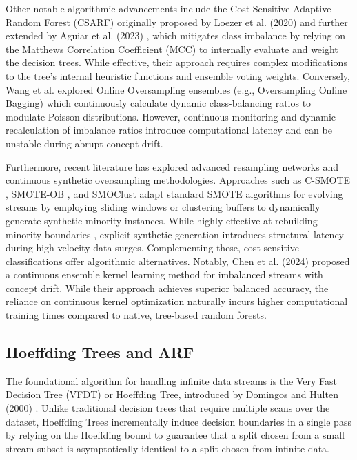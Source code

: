 \documentclass[review,12pt]{elsarticle}
\begin{document}
Other notable algorithmic advancements include the Cost-Sensitive Adaptive Random Forest (CSARF) originally proposed by Loezer et al. (2020) \cite{loezer2020csarf} and further extended by Aguiar et al. (2023) \cite{aguiarCSARF2023}, which mitigates class imbalance by relying on the Matthews Correlation Coefficient (MCC) to internally evaluate and weight the decision trees. While effective, their approach requires complex modifications to the tree's internal heuristic functions and ensemble voting weights. Conversely, Wang et al. \cite{brzezinskiOnlineOversampling2021} explored Online Oversampling ensembles (e.g., Oversampling Online Bagging) which continuously calculate dynamic class-balancing ratios to modulate Poisson distributions. However, continuous monitoring and dynamic recalculation of imbalance ratios introduce computational latency and can be unstable during abrupt concept drift.

Furthermore, recent literature has explored advanced resampling networks and continuous synthetic oversampling methodologies. Approaches such as C-SMOTE \cite{bernardoCSMOTE2020}, SMOTE-OB \cite{bernardoSMOTEOBCombiningSMOTE2021}, and SMOClust \cite{chiuSMOClust2024} adapt standard SMOTE algorithms for evolving streams by employing sliding windows or clustering buffers to dynamically generate synthetic minority instances. While highly effective at rebuilding minority boundaries \cite{abbasiClassImbalanceNetwork2025, priyaAdaptiveSyntheticOversampling2022}, explicit synthetic generation introduces structural latency during high-velocity data surges. Complementing these, cost-sensitive classifications \cite{sunCostSensitiveClassificationEvolving2021a} offer algorithmic alternatives. Notably, Chen et al. (2024) \cite{chenCostsensitiveContinuousEnsemble2024a} proposed a continuous ensemble kernel learning method for imbalanced streams with concept drift. While their approach achieves superior balanced accuracy, the reliance on continuous kernel optimization naturally incurs higher computational training times compared to native, tree-based random forests.

\subsection{Hoeffding Trees and ARF}
The foundational algorithm for handling infinite data streams is the Very Fast Decision Tree (VFDT) or Hoeffding Tree, introduced by Domingos and Hulten (2000) \cite{domingos2000mining}. Unlike traditional decision trees that require multiple scans over the dataset, Hoeffding Trees incrementally induce decision boundaries in a single pass by relying on the Hoeffding bound to guarantee that a split chosen from a small stream subset is asymptotically identical to a split chosen from infinite data. 
\end{document}
